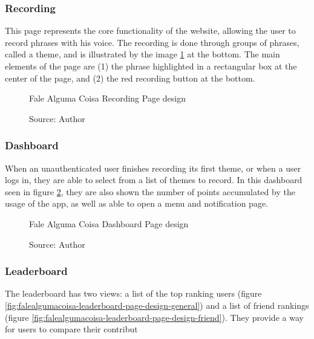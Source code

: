 \subsubsection{Recording}

This page represents the core functionality of the website, allowing the user to record phrases with his voice. The recording is done through groups of phrases, called a theme, and is illustrated by the image \ref{fig:falealgumacoisa-recording-page-design} at the bottom. The main elements of the page are (1) the phrase highlighted in a rectangular box at the center of the page, and (2) the red recording button at the bottom.

\begin{figure}[ht]
    \centering
    \caption{Fale Alguma Coisa Recording Page design}
    \caption*{Source: Author}
    \label{fig:falealgumacoisa-recording-page-design}
\end{figure}

\subsubsection{Dashboard}

When an unauthenticated user finishes recording its first theme, or when a user logs in, they are able to select from a list of themes to record. In this dashboard seen in figure \ref{fig:falealgumacoisa-dashboard-page-design}, they are also shown the number of points accumulated by the usage of the app, as well as able to open a menu and notification page.

\begin{figure}[ht]
    \centering
    \caption{Fale Alguma Coisa Dashboard Page design}
    \caption*{Source: Author}
    \label{fig:falealgumacoisa-dashboard-page-design}
\end{figure}

\subsubsection{Leaderboard}

The leaderboard has two views: a list of the top ranking users (figure \ref{fig:falealgumacoisa-leaderboard-page-design-general}) and a list of friend rankings (figure \ref{fig:falealgumacoisa-leaderboard-page-design-friend}). They provide a way for users to compare their contribut